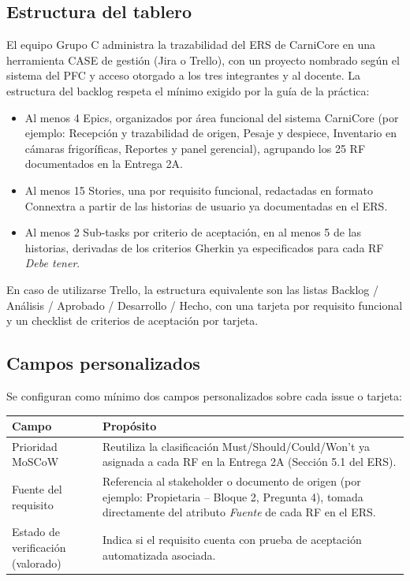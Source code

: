 \documentclass[11pt,a4paper]{article}
\begin{document}
\subsection{Estructura del tablero}
El equipo Grupo C administra la trazabilidad del ERS de CarniCore en una herramienta CASE de gestión (Jira o Trello), con un proyecto nombrado según el sistema del PFC y acceso otorgado a los tres integrantes y al docente. La estructura del backlog respeta el mínimo exigido por la guía de la práctica:

\begin{itemize}[nosep]
\item Al menos 4 Epics, organizados por área funcional del sistema CarniCore (por ejemplo: Recepción y trazabilidad de origen, Pesaje y despiece, Inventario en cámaras frigoríficas, Reportes y panel gerencial), agrupando los 25 RF documentados en la Entrega 2A.
\item Al menos 15 Stories, una por requisito funcional, redactadas en formato Connextra a partir de las historias de usuario ya documentadas en el ERS.
\item Al menos 2 Sub-tasks por criterio de aceptación, en al menos 5 de las historias, derivadas de los criterios Gherkin ya especificados para cada RF \textit{Debe tener}.
\end{itemize}

En caso de utilizarse Trello, la estructura equivalente son las listas Backlog / Análisis / Aprobado / Desarrollo / Hecho, con una tarjeta por requisito funcional y un checklist de criterios de aceptación por tarjeta.

\subsection{Campos personalizados}
Se configuran como mínimo dos campos personalizados sobre cada issue o tarjeta:

\begin{longtable}{|p{4cm}|p{10cm}|}
\hline
\textbf{Campo} & \textbf{Propósito} \\
\hline
Prioridad MoSCoW & Reutiliza la clasificación Must/Should/Could/Won't ya asignada a cada RF en la Entrega 2A (Sección 5.1 del ERS). \\
\hline
Fuente del requisito & Referencia al stakeholder o documento de origen (por ejemplo: Propietaria -- Bloque 2, Pregunta 4), tomada directamente del atributo \textit{Fuente} de cada RF en el ERS. \\
\hline
Estado de verificación (valorado) & Indica si el requisito cuenta con prueba de aceptación automatizada asociada. \\
\hline
\end{longtable}
\end{document}

